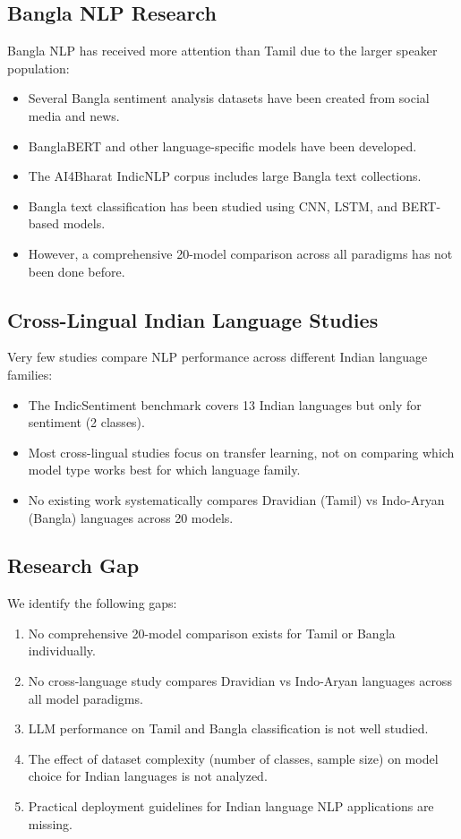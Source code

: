 \documentclass[conference]{IEEEtran}
\begin{document}
\subsection{Bangla NLP Research}

Bangla NLP has received more attention than Tamil due to the larger speaker population:
\begin{itemize}
\item Several Bangla sentiment analysis datasets have been created from social media and news.
\item BanglaBERT and other language-specific models have been developed.
\item The AI4Bharat IndicNLP corpus \cite{kunchukuttan2020} includes large Bangla text collections.
\item Bangla text classification has been studied using CNN, LSTM, and BERT-based models.
\item However, a comprehensive 20-model comparison across all paradigms has not been done before.
\end{itemize}

\subsection{Cross-Lingual Indian Language Studies}

Very few studies compare NLP performance across different Indian language families:
\begin{itemize}
\item The IndicSentiment benchmark \cite{doddapaneni2023} covers 13 Indian languages but only for sentiment (2 classes).
\item Most cross-lingual studies focus on transfer learning, not on comparing which model type works best for which language family.
\item No existing work systematically compares Dravidian (Tamil) vs Indo-Aryan (Bangla) languages across 20 models.
\end{itemize}

\subsection{Research Gap}

We identify the following gaps:
\begin{enumerate}
\item No comprehensive 20-model comparison exists for Tamil or Bangla individually.
\item No cross-language study compares Dravidian vs Indo-Aryan languages across all model paradigms.
\item LLM performance on Tamil and Bangla classification is not well studied.
\item The effect of dataset complexity (number of classes, sample size) on model choice for Indian languages is not analyzed.
\item Practical deployment guidelines for Indian language NLP applications are missing.
\end{enumerate}
\end{document}
